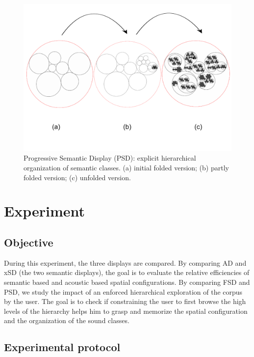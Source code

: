 \documentclass{aes2e}
\begin{document}
\begin{figure}[t]
\begin{center}
\includegraphics[scale=0.4]{gfx/XP1clean2.pdf} 
\end{center}
\caption{\label{figXP1} Progressive Semantic Display (PSD):  explicit hierarchical organization of semantic classes. (a) initial folded version; (b) partly folded version; (c) unfolded version.}
\end{figure}

\section{Experiment} \label{test}

\subsection{Objective}

During this experiment, the three displays are compared. By comparing AD and xSD (the two semantic displays), the goal is to evaluate the  relative efficiencies of semantic based and acoustic based spatial configurations. By comparing FSD and PSD, we study the impact of an enforced hierarchical exploration of the corpus by the user. The goal is to check if constraining the user to first browse the high levels of the hierarchy helps him to grasp and memorize the spatial configuration and the organization of the sound classes. 

\subsection{Experimental protocol}
\end{document}
